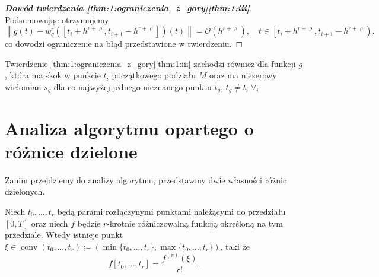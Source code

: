 \documentclass[oik, pdftex, robocza, man]{mgrwms}
\DeclareMathOperator*{\conv}{conv}
\begin{document}
\begin{proof}[\textbf{Dowód twierdzenia \ref{thm:1:ograniczenia_z_gory}\ref{thm:1:iii}}]
        Podsumowując otrzymujemy
        \begin{equation*}
            \left\|g(t)-w_{g}^{r}\left(\left[t_{i}+h^{r+\varrho}, t_{i+1}-h^{r+\varrho}\right]\right)(t)\right\|=\mathcal{O}\left(h^{r+\varrho}\right), \quad t \in\left[t_{i}+h^{r+\varrho}, t_{i+1}-h^{r+\varrho}\right).
        \end{equation*}
        co dowodzi ograniczenie na błąd przedstawione w twierdzeniu.

    \end{proof}

    \begin{uw}
        Twierdzenie \ref{thm:1:ograniczenia_z_gory}\ref{thm:1:iii} zachodzi również dla funkcji $g$, która ma skok w punkcie $t_{i}$ początkowego podziału $M$ oraz ma niezerowy wielomian $s_{g}$ dla co najwyżej jednego nieznanego punktu $t_{g}$, $t_{g} \neq t_{i} \; \forall_{i}$.
    \end{uw}


\section{Analiza algorytmu opartego o różnice dzielone}


    Zanim przejdziemy do analizy algorytmu, przedstawmy dwie własności różnic dzielonych.

    Niech $t_{0}, \ldots, t_{r}$ będą parami rozłączynymi punktami należącymi do przedziału $[0, T]$ oraz niech $f$ będzie $r$-krotnie różniczowalną funkcją określoną na tym przedziale. Wtedy istnieje punkt $\xi \in \conv (t_{0}, \ldots, t_{r}) \coloneqq \left( \min \{t_{0}, \ldots, t_{r}\}, \max \{t_{0}, \ldots, t_{r}\} \right)$, taki że
    \begin{equation} \label{eq:33:wartosc_srednia_roz_dziel}
        f\left[ t_{0}, \ldots, t_{r} \right] = \frac{f^{(r)}(\xi)}{r!}.
    \end{equation}
    
\end{document}
